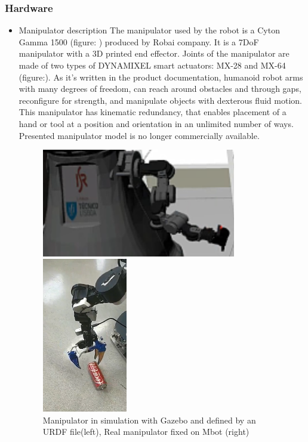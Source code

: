 \subsubsection{Hardware}
\begin{itemize}
    \item Manipulator description
The manipulator used by the robot is a Cyton Gamma 1500 (figure: ) produced by Robai company. It is a 7DoF manipulator with a 3D printed end effector. Joints of the manipulator are made of two types of DYNAMIXEL smart actuators: MX-28 and MX-64 (figure:).
As it’s written in the product documentation, humanoid robot arms with many degrees of freedom, can reach around obstacles and through gaps, reconfigure for strength, and manipulate objects with dexterous fluid motion. This manipulator has kinematic redundancy, that enables placement of a hand or tool at a position and orientation in an unlimited number of ways. Presented manipulator model is no longer commercially available.
\begin{figure} [!ht]
    \begin{minipage}[b]{0.5\linewidth}
        \centering
        \includegraphics[width=0.8\textwidth]{images/manipulator_sim.png}
    \end{minipage}
    \begin{minipage}[b]{0.5\linewidth}
      \begin{center}
        \includegraphics[width=0.35\textwidth]{images/real_robot_grasping_floor.png}
      \end{center}
    \end{minipage}
    \caption{Manipulator in simulation with Gazebo and defined by an \gls{URDF} file(left), Real manipulator fixed on Mbot (right)}
\end{figure}



\end{itemize}

